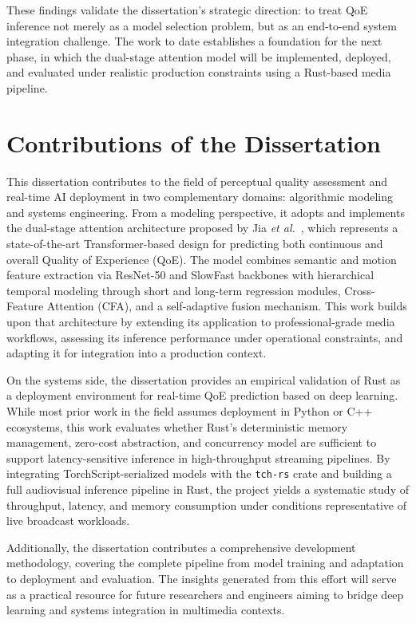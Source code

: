 These findings validate the dissertation’s strategic direction: to treat QoE inference not merely as a model selection problem, but as an end-to-end system integration challenge. The work to date establishes a foundation for the next phase, in which the dual-stage attention model will be implemented, deployed, and evaluated under realistic production constraints using a Rust-based media pipeline.

\section{Contributions of the Dissertation}

This dissertation contributes to the field of perceptual quality assessment and real-time AI deployment in two complementary domains: algorithmic modeling and systems engineering. From a modeling perspective, it adopts and implements the dual-stage attention architecture proposed by Jia \textit{et al.}~\cite{jia2024continuous}, which represents a state-of-the-art Transformer-based design for predicting both continuous and overall Quality of Experience (QoE). The model combines semantic and motion feature extraction via ResNet-50 and SlowFast backbones with hierarchical temporal modeling through short and long-term regression modules, Cross-Feature Attention (CFA), and a self-adaptive fusion mechanism. This work builds upon that architecture by extending its application to professional-grade media workflows, assessing its inference performance under operational constraints, and adapting it for integration into a production context.

On the systems side, the dissertation provides an empirical validation of Rust as a deployment environment for real-time QoE prediction based on deep learning. While most prior work in the field assumes deployment in Python or C++ ecosystems, this work evaluates whether Rust’s deterministic memory management, zero-cost abstraction, and concurrency model are sufficient to support latency-sensitive inference in high-throughput streaming pipelines. By integrating TorchScript-serialized models with the \texttt{tch-rs} crate and building a full audiovisual inference pipeline in Rust, the project yields a systematic study of throughput, latency, and memory consumption under conditions representative of live broadcast workloads.

Additionally, the dissertation contributes a comprehensive development methodology, covering the complete pipeline from model training and adaptation to deployment and evaluation. The insights generated from this effort will serve as a practical resource for future researchers and engineers aiming to bridge deep learning and systems integration in multimedia contexts.

